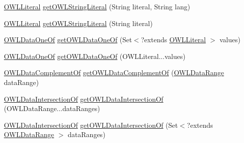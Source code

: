\begin{DoxyCompactItemize}
\item 
\hyperlink{interfaceorg_1_1semanticweb_1_1owlapi_1_1model_1_1_o_w_l_literal}{O\-W\-L\-Literal} \hyperlink{classuk_1_1ac_1_1manchester_1_1cs_1_1owl_1_1owlapi_1_1_o_w_l_data_factory_impl_affd847354334c526803adb107a4d2934}{get\-O\-W\-L\-String\-Literal} (String literal, String lang)
\item 
\hyperlink{interfaceorg_1_1semanticweb_1_1owlapi_1_1model_1_1_o_w_l_literal}{O\-W\-L\-Literal} \hyperlink{classuk_1_1ac_1_1manchester_1_1cs_1_1owl_1_1owlapi_1_1_o_w_l_data_factory_impl_af72d29fa0f65a9e4469358333bf2fb0b}{get\-O\-W\-L\-String\-Literal} (String literal)
\item 
\hyperlink{interfaceorg_1_1semanticweb_1_1owlapi_1_1model_1_1_o_w_l_data_one_of}{O\-W\-L\-Data\-One\-Of} \hyperlink{classuk_1_1ac_1_1manchester_1_1cs_1_1owl_1_1owlapi_1_1_o_w_l_data_factory_impl_a574c1072fa461fc1bf1f1b700f9a2e6d}{get\-O\-W\-L\-Data\-One\-Of} (Set$<$?extends \hyperlink{interfaceorg_1_1semanticweb_1_1owlapi_1_1model_1_1_o_w_l_literal}{O\-W\-L\-Literal} $>$ values)
\item 
\hyperlink{interfaceorg_1_1semanticweb_1_1owlapi_1_1model_1_1_o_w_l_data_one_of}{O\-W\-L\-Data\-One\-Of} \hyperlink{classuk_1_1ac_1_1manchester_1_1cs_1_1owl_1_1owlapi_1_1_o_w_l_data_factory_impl_a0a17aaec7ff41a03e2deff00b6e97dd3}{get\-O\-W\-L\-Data\-One\-Of} (O\-W\-L\-Literal...\-values)
\item 
\hyperlink{interfaceorg_1_1semanticweb_1_1owlapi_1_1model_1_1_o_w_l_data_complement_of}{O\-W\-L\-Data\-Complement\-Of} \hyperlink{classuk_1_1ac_1_1manchester_1_1cs_1_1owl_1_1owlapi_1_1_o_w_l_data_factory_impl_a1a0900dc5d84035fa031265df76c2174}{get\-O\-W\-L\-Data\-Complement\-Of} (\hyperlink{interfaceorg_1_1semanticweb_1_1owlapi_1_1model_1_1_o_w_l_data_range}{O\-W\-L\-Data\-Range} data\-Range)
\item 
\hyperlink{interfaceorg_1_1semanticweb_1_1owlapi_1_1model_1_1_o_w_l_data_intersection_of}{O\-W\-L\-Data\-Intersection\-Of} \hyperlink{classuk_1_1ac_1_1manchester_1_1cs_1_1owl_1_1owlapi_1_1_o_w_l_data_factory_impl_a9c0639ed69557d830fb091cdacd89507}{get\-O\-W\-L\-Data\-Intersection\-Of} (O\-W\-L\-Data\-Range...\-data\-Ranges)
\item 
\hyperlink{interfaceorg_1_1semanticweb_1_1owlapi_1_1model_1_1_o_w_l_data_intersection_of}{O\-W\-L\-Data\-Intersection\-Of} \hyperlink{classuk_1_1ac_1_1manchester_1_1cs_1_1owl_1_1owlapi_1_1_o_w_l_data_factory_impl_a4aa7731a0e3bab23eccbff6a235229bd}{get\-O\-W\-L\-Data\-Intersection\-Of} (Set$<$?extends \hyperlink{interfaceorg_1_1semanticweb_1_1owlapi_1_1model_1_1_o_w_l_data_range}{O\-W\-L\-Data\-Range} $>$ data\-Ranges)

\end{DoxyCompactItemize}
